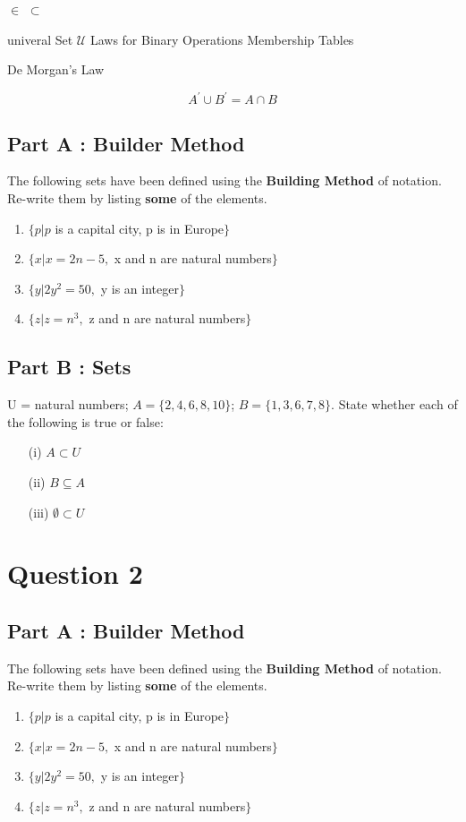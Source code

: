 \documentclass[]{report}
\begin{document}
	
	$\in$
	$\subset$
	
	univeral Set $\mathcal{U}$
	Laws for Binary Operations
	Membership Tables
	
	De Morgan's Law
	
	
	\[A^{\prime} \cup B^{\prime} = A \cap B\]
	
	\subsection*{Part A : Builder Method}
	The following sets have been defined using the \textbf{Building Method} of notation. Re-write them by listing \textbf{some} of the elements.
	\begin{enumerate}
		\item $\{p | p$ is a capital city, p is in Europe$\}$
		\item $\{x | x = 2n - 5,$ x and n are natural numbers$\}$
		\item $\{y | 2y^2 = 50,$ y is an integer$\}$
		\item $\{z | z = n^3,$ z and n are natural numbers$\}$
	\end{enumerate}
	\subsection*{Part B : Sets}
	U = {natural numbers}; $A = \{2, 4, 6, 8, 10\}$; $B = \{1, 3, 6, 7, 8\}$. State whether each of the following is true or false:
	\begin{itemize}
		\item[(i)] $A \subset U$
		\item[(ii)] $B \subseteq A$
		\item[(iii)] $\emptyset \subset U$
	\end{itemize}
	
	
	\section*{Question 2}
	\subsection*{Part A : Builder Method}
	The following sets have been defined using the \textbf{Building Method} of notation. Re-write them by listing \textbf{some} of the elements.
	\begin{enumerate}
		\item $\{p | p$ is a capital city, p is in Europe$\}$
		\item $\{x | x = 2n - 5,$ x and n are natural numbers$\}$
		\item $\{y | 2y^2 = 50,$ y is an integer$\}$
		\item $\{z | z = n^3,$ z and n are natural numbers$\}$
	\end{enumerate}
\end{document}
